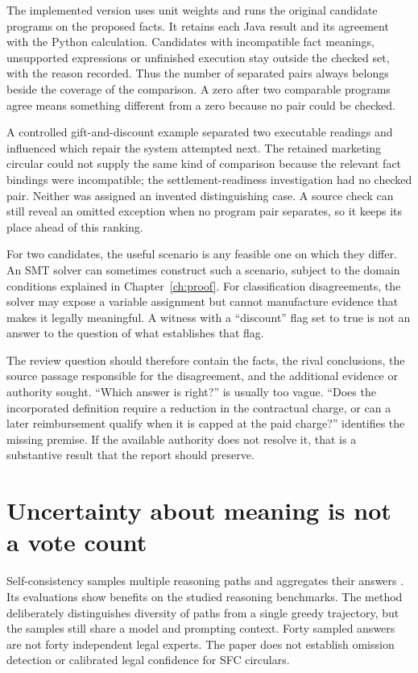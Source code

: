 The implemented version uses unit weights and runs the original candidate
programs on the proposed facts. It retains each Java result and its agreement
with the Python calculation. Candidates with incompatible fact meanings,
unsupported expressions or unfinished execution stay outside the checked set,
with the reason recorded. Thus the number of separated pairs always belongs
beside the coverage of the comparison. A zero after two comparable programs
agree means something different from a zero because no pair could be checked.

A controlled gift-and-discount example separated two executable readings and
influenced which repair the system attempted next. The retained marketing
circular could not supply the same kind of comparison because the relevant
fact bindings were incompatible; the settlement-readiness investigation had
no checked pair. Neither was assigned an invented distinguishing case. A source
check can still reveal an omitted exception when no program pair separates,
so it keeps its place ahead of this ranking.

For two candidates, the useful scenario is any feasible one on which they differ.
An SMT solver can sometimes construct such a scenario, subject to the domain
conditions explained in Chapter~\ref{ch:proof}. For classification disagreements,
the solver may expose a variable assignment but cannot manufacture evidence that
makes it legally meaningful. A witness with a ``discount'' flag set to true is not
an answer to the question of what establishes that flag.

The review question should therefore contain the facts, the rival conclusions,
the source passage responsible for the disagreement, and the additional evidence
or authority sought. ``Which answer is right?'' is usually too vague. ``Does the
incorporated definition require a reduction in the contractual charge, or can a
later reimbursement qualify when it is capped at the paid charge?'' identifies
the missing premise. If the available authority does not resolve it, that is a
substantive result that the report should preserve.

\section{Uncertainty about meaning is not a vote count}
\label{merge:M05:09}


Self-consistency samples multiple reasoning paths and aggregates their answers
\citep[section 2]{selfconsistency2023}. Its evaluations show benefits on the
studied reasoning benchmarks. The method deliberately distinguishes diversity of
paths from a single greedy trajectory, but the samples still share a model and
prompting context. Forty sampled answers are not forty independent legal experts.
The paper does not establish omission detection or calibrated legal confidence
for SFC circulars.

